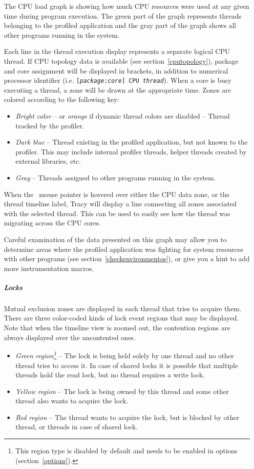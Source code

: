 \documentclass[hidelinks,titlepage,a4paper]{article}
\begin{document}
The CPU load graph is showing how much CPU resources were used at any given time during program execution. The green part of the graph represents threads belonging to the profiled application and the gray part of the graph shows all other programs running in the system.

Each line in the thread execution display represents a separate logical CPU thread. If CPU topology data is available (see section~\ref{cputopology}), package and core assignment will be displayed in brackets, in addition to numerical processor identifier (i.e. \texttt{[\emph{package}:\emph{core}] CPU \emph{thread}}). When a core is busy executing a thread, a zone will be drawn at the appropriate time. Zones are colored according to the following key:

\begin{itemize}
\item \emph{Bright color} -- or \emph{orange} if dynamic thread colors are disabled -- Thread tracked by the profiler.
\item \emph{Dark blue} -- Thread existing in the profiled application, but not known to the profiler. This may include internal profiler threads, helper threads created by external libraries, etc.
\item \emph{Gray} -- Threads assigned to other programs running in the system.
\end{itemize}

When the \faMousePointer{}~mouse pointer is hovered over either the CPU data zone, or the thread timeline label, Tracy will display a line connecting all zones associated with the selected thread. This can be used to easily see how the thread was migrating across the CPU cores.

Careful examination of the data presented on this graph may allow you to determine areas where the profiled application was fighting for system resources with other programs (see section~\ref{checkenvironmentos}), or give you a hint to add more instrumentation macros.

\subparagraph{Locks}

Mutual exclusion zones are displayed in each thread that tries to acquire them. There are three color-coded kinds of lock event regions that may be displayed. Note that when the timeline view is zoomed out, the contention regions are always displayed over the uncontented ones.

\begin{itemize}
\item \emph{Green region\footnote{This region type is disabled by default and needs to be enabled in options (section~\ref{options}).}} -- The lock is being held solely by one thread and no other thread tries to access it. In case of shared locks it is possible that multiple threads hold the read lock, but no thread requires a write lock.
\item \emph{Yellow region} -- The lock is being owned by this thread and some other thread also wants to acquire the lock.
\item \emph{Red region} -- The thread wants to acquire the lock, but is blocked by other thread, or threads in case of shared lock.
\end{itemize}
\end{document}
